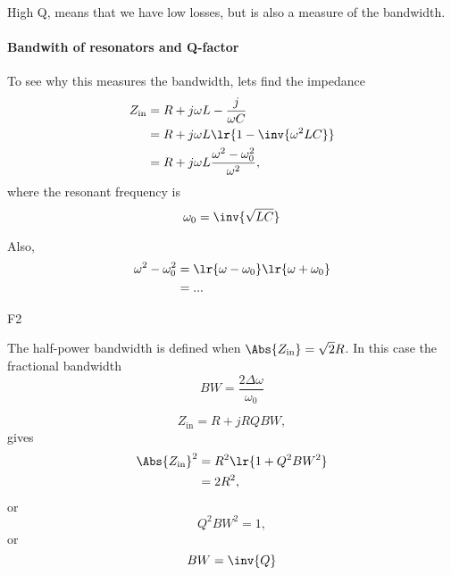 High Q, means that we have low losses, but is also a measure of the bandwidth.
\paragraph{Bandwith of resonators and Q-factor}

To see why this measures the bandwidth, lets find the impedance
\begin{equation}\label{eqn:uwavesDeck8ResonatorQfactorCore:160}
\begin{aligned}
Z_{\textrm{in}}
&= R + j \omega L - \frac{j}{\omega C}
\\ &= R + j \omega L \lr{ 1 - \inv{\omega^2 L C} }
\\ &= R + j \omega L \frac{\omega^2 - \omega_0^2}{\omega^2},
\end{aligned}
\end{equation}
where the resonant frequency is
\begin{equation}\label{eqn:uwavesDeck8ResonatorQfactorCore:180}
\omega_0 = \inv{\sqrt{LC}}
\end{equation}

Also,
\begin{equation}\label{eqn:uwavesDeck8ResonatorQfactorCore:200}
\begin{aligned}
\omega^2 - \omega_0^2 &= \lr{ \omega - \omega_0 }\lr{ \omega + \omega_0 }
\\ &=
...
\end{aligned}
\end{equation}

F2

The half-power bandwidth is defined when \( \Abs{Z_{\textrm{in}}} = \sqrt{2} R \).  In this case the fractional bandwidth
\begin{equation}\label{eqn:uwavesDeck8ResonatorQfactorCore:220}
BW = \frac{2 \Delta \omega}{\omega_0}
\end{equation}

\begin{equation}\label{eqn:uwavesDeck8ResonatorQfactorCore:240}
Z_{\textrm{in}} = R + j R Q BW,
\end{equation}
gives
\begin{equation}\label{eqn:uwavesDeck8ResonatorQfactorCore:260}
\begin{aligned}
\Abs{Z_{\textrm{in}}}^2 &= R^2\lr{ 1 + Q^2 BW^2 } \\ &= 2 R^2,
\end{aligned}
\end{equation}
or
\begin{equation}\label{eqn:uwavesDeck8ResonatorQfactorCore:280}
Q^2 BW^2 = 1,
\end{equation}
or
\begin{equation}\label{eqn:uwavesDeck8ResonatorQfactorCore:300}
BW = \inv{Q}
\end{equation}

